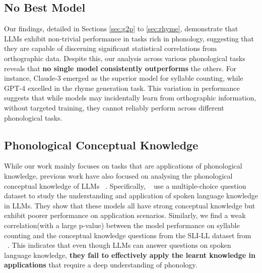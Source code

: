 \subsection{No Best Model} Our findings, detailed in Sections \ref{sec:g2p} to \ref{sec:rhyme}, demonstrate that LLMs exhibit non-trivial performance in tasks rich in phonology, suggesting that they are capable of discerning significant statistical correlations from orthographic data. Despite this, our analysis across various phonological tasks reveals that \textbf{no single model consistently outperforms} the others. For instance, Claude-3 emerged as the superior model for syllable counting, while GPT-4 excelled in the rhyme generation task. This variation in performance suggests that while models may incidentally learn from orthographic information, without targeted training, they cannot reliably perform across different phonological tasks. 

\subsection{Phonological Conceptual Knowledge} While our work mainly focuses on tasks that are applications of phonological knowledge, previous work have also focused on analysing the phonological conceptual knowledge of LLMs ~\citep{peng2023spoken}. Specifically, ~\cite{peng2023spoken} use a multiple-choice question dataset to study the understanding and application of spoken language knowledge in LLMs. They show that these models all have strong conceptual knowledge but exhibit poorer performance on application scenarios. Similarly, we find a weak correlation(with a large p-value) between the model performance on syllable counting and the conceptual knowledge questions from the SLI-LL dataset from ~\cite{peng2023spoken}. This indicates that even though LLMs can answer questions on spoken language knowledge, \textbf{they fail to effectively apply the learnt knowledge in applications} that require a deep understanding of phonology. 

